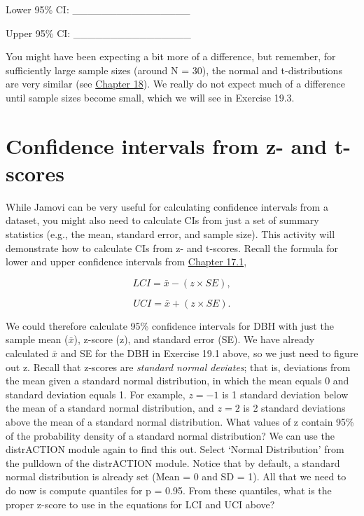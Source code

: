 \documentclass[
]{scrbook}
\begin{document}
Lower 95\% CI: \_\_\_\_\_\_\_\_\_\_\_\_\_\_\_\_

Upper 95\% CI: \_\_\_\_\_\_\_\_\_\_\_\_\_\_\_\_

You might have been expecting a bit more of a difference, but remember, for sufficiently large sample sizes (around N = 30), the normal and t-distributions are very similar (see \protect\hyperlink{Chapter_18}{Chapter 18}).
We really do not expect much of a difference until sample sizes become small, which we will see in Exercise 19.3.

\hypertarget{confidence-intervals-from-z--and-t-scores}{%
\section{Confidence intervals from z- and t-scores}\label{confidence-intervals-from-z--and-t-scores}}

While Jamovi can be very useful for calculating confidence intervals from a dataset, you might also need to calculate CIs from just a set of summary statistics (e.g., the mean, standard error, and sample size).
This activity will demonstrate how to calculate CIs from z- and t-scores.
Recall the formula for lower and upper confidence intervals from \protect\hyperlink{Chapter_17.htmlux5cux23normal-distribution-cis}{Chapter 17.1},

\[LCI = \bar{x} - (z \times SE),\]

\[UCI = \bar{x} + (z \times SE).\]

We could therefore calculate 95\% confidence intervals for DBH with just the sample mean (\(\bar{x}\)), z-score (z), and standard error (SE).
We have already calculated \(\bar{x}\) and SE for the DBH in Exercise 19.1 above, so we just need to figure out z.
Recall that z-scores are \emph{standard normal deviates}; that is, deviations from the mean given a standard normal distribution, in which the mean equals 0 and standard deviation equals 1.
For example, \(z = -1\) is 1 standard deviation below the mean of a standard normal distribution, and \(z = 2\) is 2 standard deviations above the mean of a standard normal distribution.
What values of z contain 95\% of the probability density of a standard normal distribution?
We can use the distrACTION module again to find this out.
Select `Normal Distribution' from the pulldown of the distrACTION module.
Notice that by default, a standard normal distribution is already set (Mean = 0 and SD = 1).
All that we need to do now is compute quantiles for p = 0.95.
From these quantiles, what is the proper z-score to use in the equations for LCI and UCI above?
\end{document}
